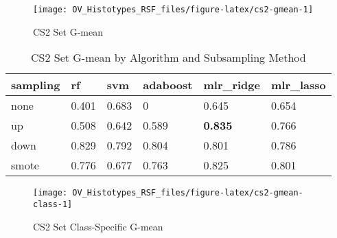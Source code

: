 \documentclass[
]{report}
\begin{document}
\begin{figure}[H]

{\centering \texttt{[image: OV\_Histotypes\_RSF\_files/figure-latex/cs2-gmean-1]} 

}

\caption{CS2 Set G-mean}\label{fig:cs2-gmean}
\end{figure}

\begin{table}

\caption{\label{tab:cs2-gmean-table}CS2 Set G-mean by Algorithm and Subsampling Method}
\centering
\begin{tabular}[t]{l|l|l|l|l|l}
\hline
sampling & rf & svm & adaboost & mlr\_ridge & mlr\_lasso\\
\hline
none & 0.401 & 0.683 & 0 & 0.645 & 0.654\\
\hline
up & 0.508 & 0.642 & 0.589 & \textbf{0.835} & 0.766\\
\hline
down & 0.829 & 0.792 & 0.804 & 0.801 & 0.786\\
\hline
smote & 0.776 & 0.677 & 0.763 & 0.825 & 0.801\\
\hline
\end{tabular}
\end{table}

\begin{figure}[H]

{\centering \texttt{[image: OV\_Histotypes\_RSF\_files/figure-latex/cs2-gmean-class-1]} 

}

\caption{CS2 Set Class-Specific G-mean}\label{fig:cs2-gmean-class}
\end{figure}
\end{document}
